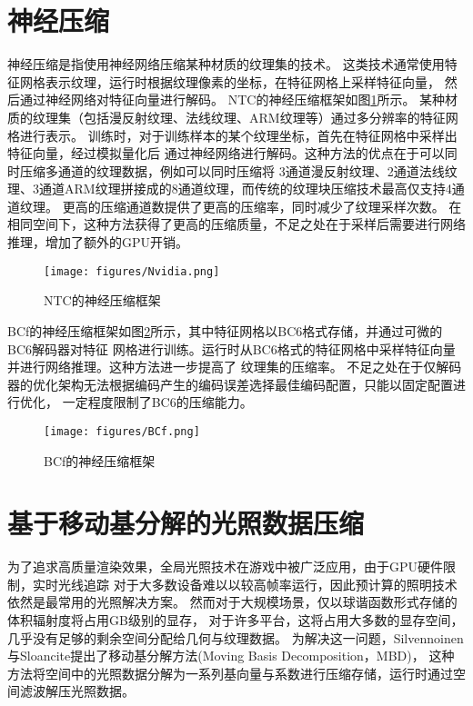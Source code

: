 \section{神经压缩}

神经压缩是指使用神经网络压缩某种材质的纹理集的技术。
这类技术通常使用特征网格表示纹理，运行时根据纹理像素的坐标，在特征网格上采样特征向量，
然后通过神经网络对特征向量进行解码。
NTC\cite{vaidyanathan2023random}的神经压缩框架如图\ref{fig:Nvidia}所示。
某种材质的纹理集（包括漫反射纹理、法线纹理、ARM纹理等）通过多分辨率的特征网格进行表示。
训练时，对于训练样本的某个纹理坐标，首先在特征网格中采样出特征向量，经过模拟量化后
通过神经网络进行解码。这种方法的优点在于可以同时压缩多通道的纹理数据，例如可以同时压缩将
3通道漫反射纹理、2通道法线纹理、3通道ARM纹理拼接成的8通道纹理，而传统的纹理块压缩技术最高仅支持4通道纹理。
更高的压缩通道数提供了更高的压缩率，同时减少了纹理采样次数。
在相同空间下，这种方法获得了更高的压缩质量，不足之处在于采样后需要进行网络推理，增加了额外的GPU开销。

\begin{figure}[htbp]
    \centering
    \texttt{[image: figures/Nvidia.png]}
    \caption{NTC的神经压缩框架\cite{vaidyanathan2023random}}
    \label{fig:Nvidia}
\end{figure}

BCf\cite{weinreich2024real}的神经压缩框架如图\ref{fig:BCf}所示，其中特征网格以BC6格式存储，并通过可微的BC6解码器对特征
网格进行训练。运行时从BC6格式的特征网格中采样特征向量并进行网络推理。这种方法进一步提高了
纹理集的压缩率。
不足之处在于仅解码器的优化架构无法根据编码产生的编码误差选择最佳编码配置，只能以固定配置进行优化，
一定程度限制了BC6的压缩能力。

\begin{figure}[htbp]
    \centering
    \texttt{[image: figures/BCf.png]}
    \caption{BCf的神经压缩框架\cite{weinreich2024real}}
    \label{fig:BCf}
\end{figure}


\section{基于移动基分解的光照数据压缩}

为了追求高质量渲染效果，全局光照技术在游戏中被广泛应用，由于GPU硬件限制，实时光线追踪
对于大多数设备难以以较高帧率运行，因此预计算的照明技术依然是最常用的光照解决方案。
然而对于大规模场景，仅以球谐函数形式存储的体积辐射度将占用GB级别的显存\cite{silvennoinen2021moving}，
对于许多平台，这将占用大多数的显存空间，几乎没有足够的剩余空间分配给几何与纹理数据。
为解决这一问题，Silvennoinen与Sloancite\cite{silvennoinen2021moving}提出了移动基分解方法(Moving Basis Decomposition，MBD)，
这种方法将空间中的光照数据分解为一系列基向量与系数进行压缩存储，运行时通过空间滤波解压光照数据。

